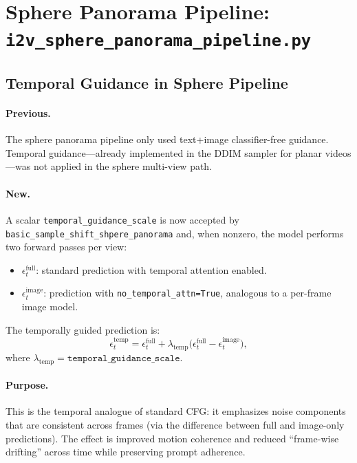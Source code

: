 \documentclass[11pt,a4paper]{article}
\newcommand{\file}[1]{\texttt{#1}}
\newcommand{\fn}[1]{\texttt{#1}}
\begin{document}
\section{Sphere Panorama Pipeline: \file{i2v\_sphere\_panorama\_pipeline.py}}

\subsection{Temporal Guidance in Sphere Pipeline}

\paragraph{Previous.}
The sphere panorama pipeline only used text+image classifier-free guidance.
Temporal guidance---already implemented in the DDIM sampler for planar videos---was not applied in the sphere multi-view path.

\paragraph{New.}
A scalar \fn{temporal\_guidance\_scale} is now accepted by \fn{basic\_sample\_shift\_shpere\_panorama} and,
when nonzero, the model performs two forward passes per view:
\begin{itemize}
    \item \(\epsilon_t^\text{full}\): standard prediction with temporal attention enabled.
    \item \(\epsilon_t^\text{image}\): prediction with \fn{no\_temporal\_attn=True}, analogous to a per-frame image model.
\end{itemize}
The temporally guided prediction is:
\begin{equation}
    \epsilon_t^\text{temp} = \epsilon_t^\text{full}
    + \lambda_\text{temp} \bigl(\epsilon_t^\text{full} - \epsilon_t^\text{image}\bigr),
\end{equation}
where \(\lambda_\text{temp} = \texttt{temporal\_guidance\_scale}\).

\paragraph{Purpose.}
This is the temporal analogue of standard CFG:
it emphasizes noise components that are consistent across frames (via the difference between full and image-only predictions).
The effect is improved motion coherence and reduced ``frame-wise drifting'' across time while preserving prompt adherence.
\end{document}
